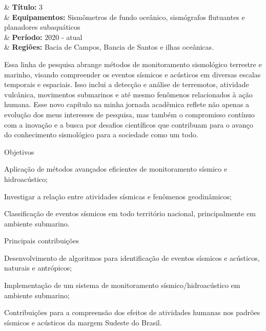\documentclass[10pt,a4paper,oneside]{book}
\begin{document}
\bigskip

\begin{summarybox}[frametitle=\faProjectDiagram{}\quad Panorama do Projeto de Pesquisa]
	\begin{datelist}
		\faFile* & \textbf{Título:} 3 \\
		\faBinoculars & \textbf{Equipamentos:} Sismômetros de fundo oceânico, sismógrafos flutuantes e planadores subaquáticos \\
		\faCalendar*[regular] & \textbf{Período:} 2020 - atual \\
		\faMapMarked* & \textbf{Regiões:} Bacia de Campos, Bancia de Santos e ilhas oceânicas. \\
	\end{datelist}
\end{summarybox}

\bigskip

Essa linha de pesquisa abrange métodos de monitoramento sismológico terrestre e marinho, visando compreender os eventos sísmicos e acústicos em diversas escalas temporais e espaciais. Isso inclui a detecção e análise de terremotos, atividade vulcânica, movimentos submarinos e até mesmo fenômenos relacionados à ação humana. Esse novo capítulo na minha jornada acadêmica reflete não apenas a evolução dos meus interesses de pesquisa, mas também o compromisso contínuo com a inovação e a busca por desafios científicos que contribuam para o avanço do conhecimento sismológico para a sociedade como um todo.

\begin{fancyenum}{\faFutbol}{Objetivos}
  \item Aplicação de métodos avançados eficientes de monitoramento sísmico e hidroacústico;
  \item Investigar a relação entre atividades sísmicas e fenômenos geodinâmicos;
  \item Classificação de eventos sísmicos em todo território nacional, principalmente em ambiente submarino.
\end{fancyenum}

\begin{fancyenum}{\faCogs}{Principais contribuições}
  \item Desenvolvimento de algoritmos para identificação de eventos sísmicos e acústicos, naturais e antrópicos;
  \item Implementação de um sistema de monitoramento sísmico/hidroacústico em ambiente submarino;
  \item Contribuições para a compreensão dos efeitos de atividades humanas nos padrões sísmicos e acústicos da margem Sudeste do Brasil.
\end{fancyenum}
\end{document}
